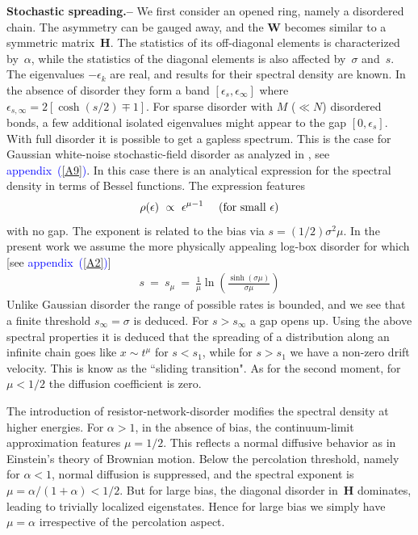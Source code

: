 \documentclass[aps,pre,floats,floatfix,twocolumn]{revtex4}
\newcommand{\be}[1]{\begin{eqnarray}\ifthenelse{#1=-1}{\nonumber}{\ifthenelse{#1=0}{}{\label{e#1}}}}
\newcommand{\beq}{\begin{eqnarray}}
\newcommand{\eeq}{\end{eqnarray}}
\newcommand{\Ap}[1]{\textcolor{blue}{{appendix}\!~(\ref{#1})}}
\newcommand{\sect}[1]{{\bf #1.-- }}
\begin{document}
\sect{Stochastic spreading}
%
We first consider an opened ring, namely a disordered chain. 
The asymmetry can be gauged away, and the $\bm{W}$ becomes similar 
to a symmetric matrix~$\bm{H}$. The statistics of its off-diagonal elements 
is characterized by~$\alpha$, 
while the statistics of the diagonal elements 
is also affected by~$\sigma$ and~$s$.   
The eigenvalues ${-\epsilon_k}$ are real, 
and  results for their spectral density are known.
In the absence of disorder they form a band ${[\epsilon_s,\epsilon_{\infty}]}$
where ${\epsilon_{s,\infty}=2[\cosh(s/2)\mp1]}$. 
%
For sparse disorder with $M$ ($\ll N$) disordered bonds, 
a few additional isolated eigenvalues might appear 
to the gap ${[0,\epsilon_s]}$.
%
With full disorder it is possible to get a gapless spectrum. 
This is the case for Gaussian white-noise stochastic-field disorder 
as analyzed in \cite{odh3}, see \Ap{A9}.
In this case there is an analytical expression 
for the spectral density in terms of Bessel functions.
The expression features 
%
\be{3}
\rho(\epsilon) \ \propto \ \epsilon^{\mu-1} \ \ \ \ \text{(for small $\epsilon$)}
\eeq
%
with no gap. 
The exponent is related to the bias via ${s=(1/2) \sigma^2 \mu}$. 
%
In the present work we assume the more physically appealing log-box 
disorder for which [see \Ap{A2}]
%
\beq
s \ = \ s_{\mu} \ = \ \frac{1}{\mu} \ln\left( \frac{\sinh (\sigma\mu)}{\sigma\mu} \right)
\eeq
%
Unlike Gaussian disorder the range of possible rates is bounded,  
and we see that a finite threshold ${s_{\infty}=\sigma}$ is deduced.
For ${s>s_{\infty}}$ a gap opens up. 
%
Using the above spectral properties it is deduced that the  
spreading of a distribution along an infinite chain 
goes like $x\sim t^{\mu}$ for ${s<s_1}$, 
while for $s>s_1$ we have a non-zero drift velocity.
This is know as the ``sliding transition".
As for the second moment, for ${\mu<1/2}$ 
the diffusion coefficient is zero. 

The introduction of resistor-network-disorder modifies 
the spectral density at higher energies.
For ${\alpha>1}$, in the absence of bias, 
the continuum-limit approximation features ${\mu=1/2}$.
This reflects a normal diffusive behavior 
as in Einstein's theory of Brownian motion. 
Below the percolation threshold, namely for ${\alpha<1}$,
normal diffusion is suppressed, 
and the spectral exponent is ${\mu=\alpha/(1{+}\alpha)<1/2}$. 
But for large bias, the diagonal disorder in~$\bm{H}$ dominates,  
leading to trivially localized eigenstates. 
Hence for large bias we simply have ${\mu=\alpha}$
irrespective of the percolation aspect.  
\end{document}
